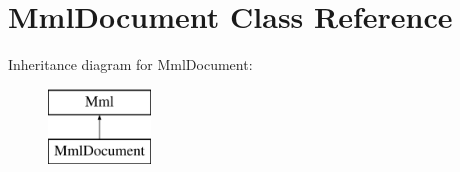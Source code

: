 \hypertarget{class_mml_document}{}\section{Mml\+Document Class Reference}
\label{class_mml_document}
Inheritance diagram for Mml\+Document\+:\begin{figure}[H]
\begin{center}
\leavevmode
\includegraphics[height=2.000000cm]{class_mml_document}
\end{center}
\end{figure}
